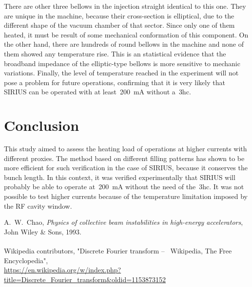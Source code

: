 \documentclass
[
    a4paper,
    nospread,     %
]{jacow}
\begin{document}
    There are other three bellows in the injection straight identical to this one. They are unique in the machine, because their cross-section is elliptical, due to the different shape of the vacuum chamber of that sector. Since only one of them heated, it must be result of some mechanical conformation of this component. On the other hand, there are hundreds of round bellows in the machine and none of them showed any temperature rise. This is an statistical evidence that the broadband impedance of the elliptic-type bellows is more sensitive to mechanic variations. Finally, the level of temperature reached in the experiment will not pose a problem for future operations, confirming that it is very likely that SIRIUS can be operated with at least~\SI{200}{\milli\ampere} without a~\gls{3hc}.

\section{Conclusion}

This study aimed to assess the heating load of operations at higher currents with different proxies. The method based on different filling patterns has shown to be more efficient for such verification in the case of SIRIUS, because it conserves the bunch length. In this context, it was verified experimentally that SIRIUS will probably be able to operate at~\SI{200}{\milli\ampere} without the need of the~\gls{3hc}. It was not possible to test higher currents because of the temperature limitation imposed by the RF cavity window.
%
%
%
{\printbibliography}%
{%

    \begin{thebibliography}{9} %

        A.~W.~Chao,
        \textit{Physics of collective beam instabilities in high-energy accelerators},
        John Wiley \& Sons, 1993. \\ \\
        
        Wikipedia contributors,
        "Discrete Fourier transform --~ Wikipedia, The Free Encyclopedia",\\
        \url{https://en.wikipedia.org/w/index.php?title=Discrete_Fourier_transform&oldid=1153873152}
    \end{thebibliography}
} %
\end{document}
